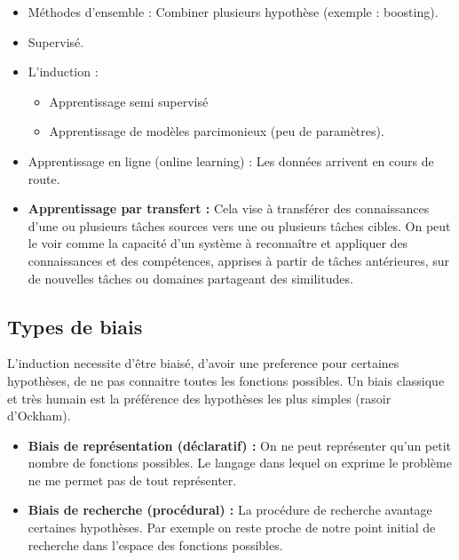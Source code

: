 \documentclass{article}
\begin{document}
\begin{itemize}

\item Méthodes d'ensemble : Combiner plusieurs hypothèse (exemple : boosting).

\item Supervisé.

\item L'induction :
    \begin{itemize}
    \item Apprentissage semi supervisé 
    \item Apprentissage de modèles parcimonieux (peu de paramètres).
    \end{itemize}

\item Apprentissage en ligne (online learning) : Les données arrivent en cours de route.

\item \textbf{Apprentissage par transfert :} Cela vise à transférer des connaissances d'une ou plusieurs tâches sources vers une ou plusieurs tâches cibles. On peut le voir comme la capacité d’un système à reconnaître et appliquer des connaissances et des compétences, apprises à partir de tâches antérieures, sur de nouvelles tâches ou domaines partageant des similitudes.

\end{itemize}

\subsection{Types de biais}

L'induction necessite d'être biaisé, d'avoir une preference pour certaines hypothèses, de ne pas connaitre toutes les fonctions possibles. Un biais classique et très humain est la préférence des hypothèses les plus simples (rasoir d'Ockham).

\begin{itemize}
\item \textbf{Biais de représentation (déclaratif) :} On ne peut représenter qu'un petit nombre de fonctions possibles. Le langage dans lequel on exprime le problème ne me permet pas de tout représenter.
\item \textbf{Biais de recherche (procédural) :} La procédure de recherche avantage certaines hypothèses. Par exemple on reste proche de notre point initial de recherche dans l'espace des fonctions possibles.
\end{itemize}
\end{document}
